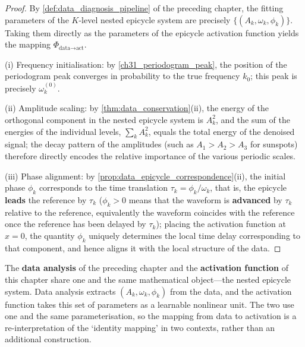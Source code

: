 \begin{proof}
By \cref{def:data_diagnosis_pipeline} of the preceding chapter, the fitting parameters of the $K$-level nested epicycle system are precisely $\{(A_k,\omega_k,\phi_k)\}$. Taking them directly as the parameters of the epicycle activation function yields the mapping $\Phi_{\text{data}\to\text{act}}$.

(i) Frequency initialisation: by \cref{ch31_periodogram_peak}, the position of the periodogram peak converges in probability to the true frequency $k_0$; this peak is precisely $\omega_k^{(0)}$.

(ii) Amplitude scaling: by \cref{thm:data_conservation}(ii), the energy of the orthogonal component in the nested epicycle system is $A_k^2$, and the sum of the energies of the individual levels, $\sum_k A_k^2$, equals the total energy of the denoised signal; the decay pattern of the amplitudes (such as $A_1 > A_2 > A_3$ for sunspots) therefore directly encodes the relative importance of the various periodic scales.

(iii) Phase alignment: by \cref{prop:data_epicycle_correspondence}(ii), the initial phase $\phi_k$ corresponds to the time translation $\tau_k = \phi_k/\omega_k$, that is, the epicycle \textbf{leads} the reference by $\tau_k$ ($\phi_k>0$ means that the waveform is \textbf{advanced} by $\tau_k$ relative to the reference, equivalently the waveform coincides with the reference once the reference has been delayed by $\tau_k$); placing the activation function at $x=0$, the quantity $\phi_k$ uniquely determines the local time delay corresponding to that component, and hence aligns it with the local structure of the data.
\end{proof}

\begin{remark}\label{rem:mapping_naturalness}
The \textbf{data analysis} of the preceding chapter and the \textbf{activation function} of this chapter share one and the same mathematical object---the nested epicycle system. Data analysis extracts $(A_k,\omega_k,\phi_k)$ from the data, and the activation function takes this set of parameters as a learnable nonlinear unit. The two use one and the same parameterisation, so the mapping from data to activation is a re-interpretation of the `identity mapping' in two contexts, rather than an additional construction.
\end{remark}


